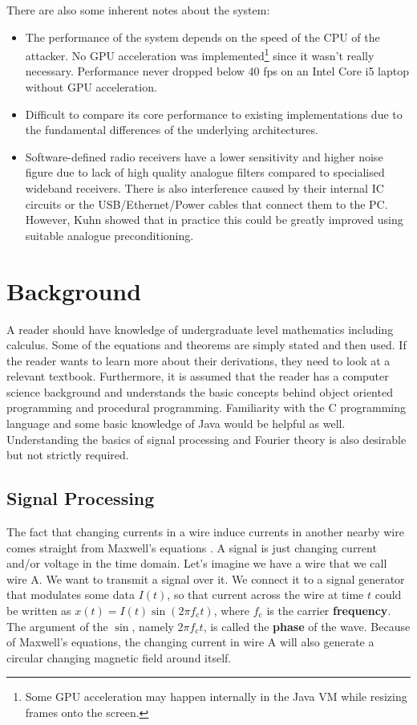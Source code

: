 \documentclass[a4paper,12pt,twoside,openright]{report}
\begin{document}
There are also some inherent notes about the system:
\begin{itemize}

  \item The performance of the system depends on the speed of the CPU of the attacker. No GPU acceleration was implemented\footnote{Some GPU acceleration may happen internally in the Java VM while resizing frames onto the screen.} since it wasn't really necessary. Performance never dropped below 40 fps on an Intel Core i5 laptop without GPU acceleration.
  \item Difficult to compare its core performance to existing implementations due to the fundamental differences of the underlying architectures.
  \item Software-defined radio receivers have a lower sensitivity and higher noise figure due to lack of high quality analogue filters compared to specialised wideband receivers. There is also interference caused by their internal IC circuits or the USB/Ethernet/Power cables that connect them to the PC. However, Kuhn showed that in practice this could be greatly improved using suitable analogue preconditioning.
  
\end{itemize}

\chapter{Background}
\label{chap:background}

A reader should have knowledge of undergraduate level mathematics including calculus. Some of the equations and theorems are simply stated and then used. If the reader wants to learn more about their derivations, they need to look at a relevant textbook. Furthermore, it is assumed that the reader has a computer science background and understands the basic concepts behind object oriented programming and procedural programming. Familiarity with the C programming language and some basic knowledge of Java would be helpful as well. Understanding the basics of signal processing and Fourier theory is also desirable but not strictly required.

\section{Signal Processing} 

The fact that changing currents in a wire induce currents in another nearby wire comes straight from Maxwell's equations \cite{maxwell1881treatise}. A signal is just changing current and/or voltage in the time domain. Let's imagine we have a wire that we call wire A. We want to transmit a signal over it. We connect it to a signal generator that modulates some data $I(t)$, so that current across the wire at time $t$ could be written as $x(t) = I(t) \sin(2\pi f_\text{c} t)$, where $f_\text{c}$ is the carrier \textbf{frequency}. The argument of the $\sin$, namely $2\pi f_\text{c} t$, is called the \textbf{phase} of the wave. Because of Maxwell's equations, the changing current in wire A will also generate a circular changing magnetic field around itself.
\end{document}
